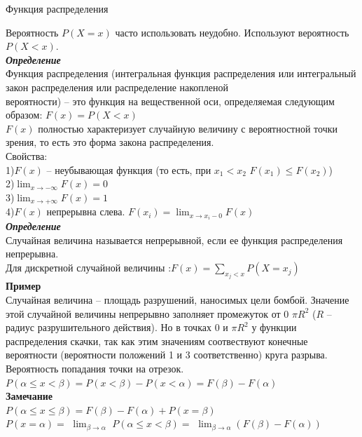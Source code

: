 \documentclass[russian, 12pt, fleqn]{article}
\begin{document}
\begin{center}
$\textbf{Функция распределения }$\\
\end{center}
Вероятность $P(X=x)$ часто использовать неудобно. Используют вероятность $P(X<x).$\\
\textit{\textbf{Определение}}\\
Функция распределения (интегральная функция распределения или интегральный закон распределения или распределение накопленой\\ вероятности)  -- это функция на вещественной оси, определяемая следующим образом: $F(x)=P(X<x)$\\
$F(x)$ полностью характеризует случайную величину с вероятностной точки зрения, то есть это форма закона распределения.\\
Свойства:\\
1)$F(x)$ -- неубывающая функция (то есть, при $x_1 < x_2$ $F(x_1) \leq F(x_2)$)\\
2)$\displaystyle{  \lim_{x\to{-\infty}}  } F(x) = 0$\\
3)$\displaystyle{  \lim_{x\to{+\infty}}  } F(x)  = 1$\\
4)$F(x)$ непрерывна слева. $\displaystyle{ F(x_i) = \lim_{x\to{x_i - 0}} F(x) }$ \\
\textit{\textbf{Определение}}\\
Случайная величина называется непрерывной, если ее функция распределения непрерывна.\\
Для дискретной случайной величины :$F(x) = \sum\limits_{x_j < x}P(X=x_j)$\\
\textbf{Пример\ }\\
Случайная величина -- площадь разрушений, наносимых цели  бомбой. Значение этой случайной величины непрерывно заполняет промежуток от $0$ $\pi R^2$ ($R$ -- радиус разрушительного действия). Но в точках $0$ и $\pi R^2$ у функции распределения скачки, так как этим значениям соотвествуют конечные вероятности (вероятности положений 1 и 3 соответственно) круга разрыва.\\
Вероятность попадания точки на отрезок.\\
$P(\alpha \leq  x <  \beta) = P(x < \beta) - P(x < \alpha) = F(\beta) - F(\alpha)$\\
\textbf{Замечание\ } \\
$P(\alpha \leq  x \leq  \beta) = F(\beta) - F(\alpha) + P(x = \beta)$\\
$P(x = \alpha)=$   $\displaystyle{  \lim_{\beta \to{\alpha}}} $           $ P(\alpha \leq x < \beta) =$    $\displaystyle { \lim_{\beta \to {\alpha}}} (F(\beta) - F(\alpha))$\\
\end{document}
